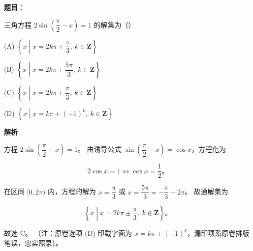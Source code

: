 \begin{answer}

\textbf{题目}：

三角方程 $2\sin\left(\dfrac{\pi}{2} - x\right) = 1$ 的解集为（\qquad）

(A) $\left\{x \mathrel{}\middle|\mathrel{} x = 2k\pi + \dfrac{\pi}{3},\ k \in \mathbf{Z}\right\}$

(B) $\left\{x \mathrel{}\middle|\mathrel{} x = 2k\pi + \dfrac{5\pi}{3},\ k \in \mathbf{Z}\right\}$

(C) $\left\{x \mathrel{}\middle|\mathrel{} x = 2k\pi \pm \dfrac{\pi}{3},\ k \in \mathbf{Z}\right\}$

(D) $\left\{x \mathrel{}\middle|\mathrel{} x = k\pi + (-1)^k,\ k \in \mathbf{Z}\right\}$

\textbf{解析}

方程 $2\sin\left(\dfrac{\pi}{2} - x\right) = 1$。
由诱导公式 $\sin\left(\dfrac{\pi}{2} - x\right) = \cos x$，方程化为

\nopagebreak[4]
\[
2\cos x = 1 \iff \cos x = \dfrac{1}{2}\mbox{。}
\]

在区间 $[0, 2\pi)$ 内，方程的解为 $x = \dfrac{\pi}{3}$ 或 $x = \dfrac{5\pi}{3} = -\dfrac{\pi}{3} + 2\pi$。
故通解集为

\nopagebreak[4]
\[
\left\{x \mathrel{}\middle|\mathrel{} x = 2k\pi \pm \dfrac{\pi}{3},\ k \in \mathbf{Z}\right\}\mbox{。}
\]

故选 C。
（注：原卷选项 (D) 印载字面为 $x = k\pi + (-1)^k$，漏印项系原卷排版笔误，忠实照录）。


\end{answer}
